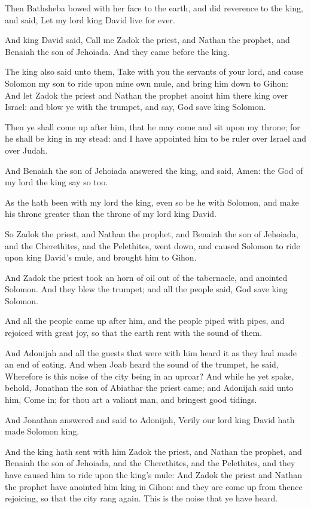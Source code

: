 \Verse Then Bathsheba bowed with her face to the earth, and did reverence to the king, and said, Let my lord king David live for ever.

\Verse And king David said, Call me Zadok the priest, and Nathan the prophet, and Benaiah the son of Jehoiada. And they came before the king.

\Verse The king also said unto them, Take with you the servants of your lord, and cause Solomon my son to ride upon mine own mule, and bring him down to Gihon: \Verse And let Zadok the priest and Nathan the prophet anoint him there king over Israel: and blow ye with the trumpet, and say, God save king Solomon.

\Verse Then ye shall come up after him, that he may come and sit upon my throne; for he shall be king in my stead: and I have appointed him to be ruler over Israel and over Judah.

\Verse And Benaiah the son of Jehoiada answered the king, and said, Amen: the \LORD God of my lord the king say so too.

\Verse As the \LORD hath been with my lord the king, even so be he with Solomon, and make his throne greater than the throne of my lord king David.

\Verse So Zadok the priest, and Nathan the prophet, and Benaiah the son of Jehoiada, and the Cherethites, and the Pelethites, went down, and caused Solomon to ride upon king David's mule, and brought him to Gihon.

\Verse And Zadok the priest took an horn of oil out of the tabernacle, and anointed Solomon. And they blew the trumpet; and all the people said, God save king Solomon.

\Verse And all the people came up after him, and the people piped with pipes, and rejoiced with great joy, so that the earth rent with the sound of them.

\Verse And Adonijah and all the guests that were with him heard it as they had made an end of eating. And when Joab heard the sound of the trumpet, he said, Wherefore is this noise of the city being in an uproar?  \Verse And while he yet spake, behold, Jonathan the son of Abiathar the priest came; and Adonijah said unto him, Come in; for thou art a valiant man, and bringest good tidings.

\Verse And Jonathan answered and said to Adonijah, Verily our lord king David hath made Solomon king.

\Verse And the king hath sent with him Zadok the priest, and Nathan the prophet, and Benaiah the son of Jehoiada, and the Cherethites, and the Pelethites, and they have caused him to ride upon the king's mule: \Verse And Zadok the priest and Nathan the prophet have anointed him king in Gihon: and they are come up from thence rejoicing, so that the city rang again. This is the noise that ye have heard.


